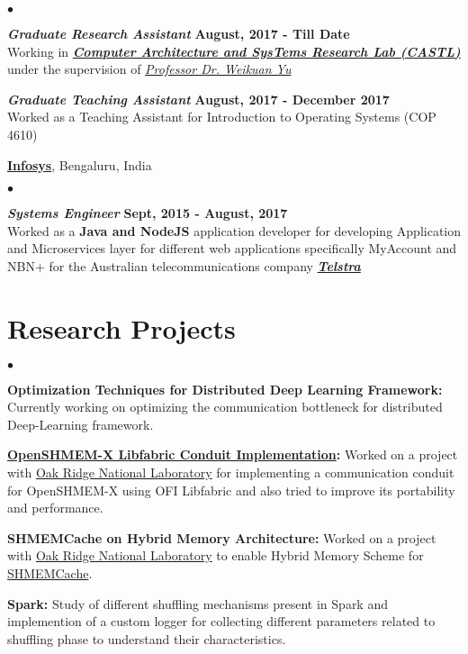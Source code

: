 \documentclass[margin,line]{res}
\newenvironment{list2}{
  \begin{list}{$\bullet$}{%
      \setlength{\itemsep}{0in}
      \setlength{\parsep}{0in} \setlength{\parskip}{0in}
      \setlength{\topsep}{0in} \setlength{\partopsep}{0in} 
      \setlength{\leftmargin}{0.2in}}}{\end{list}}
\begin{document}
\begin{resume}
\begin{list2}
\item \textbf{{\em Graduate Research Assistant}} \hfill {\bf August, 2017 - 
Till 
Date}\\
Working in \textbf{\textit{\href{http://castl.cs.fsu.edu/doku.php/}{Computer 
Architecture and SysTems Research Lab (CASTL)}}} under the supervision of 
\textit{\href{https://www.cs.fsu.edu/~yuw/}{Professor Dr. Weikuan Yu}}

\item \textbf{{\em Graduate Teaching Assistant}} \hfill {\bf August, 2017 - 
December 
2017}\\
Worked as a Teaching Assistant for Introduction to Operating Systems (COP 4610)
\end{list2}
\vspace{-.4cm}

{\bf \href{https://www.infosys.com/}{Infosys}}, Bengaluru, India
\begin{list2}
\item \textbf{{\em Systems Engineer}} \hfill {\bf Sept, 2015 - August, 2017}\\
Worked as a {\bf Java and NodeJS} application developer for developing 
Application and Microservices layer for different web applications specifically 
MyAccount and NBN+ for the Australian telecommunications company
\textbf{\textit{\href{https://www.telstra.com.au/Telstra/}{Telstra}}}
\end{list2}
\vspace*{-.18in}
\section{\sc Research Projects}
\begin{list2}
	\item {\bf 
		{Optimization Techniques for Distributed Deep Learning Framework}:} 
		Currently working on optimizing the communication bottleneck for 
		distributed Deep-Learning framework.
	\item {\bf 
		\href{https://github.com/ornl-languages/ornl-openshmem/}{OpenSHMEM-X 
			Libfabric 
			Conduit Implementation}:} Worked on a project with 
	\href{https://www.ornl.gov/}{Oak Ridge National Laboratory} for 
	implementing a 
	communication conduit for OpenSHMEM-X using OFI Libfabric and also tried to 
	improve 
	its portability and performance.
	\item {\bf SHMEMCache on Hybrid Memory Architecture:} Worked on a project 
	with 
	\href{https://www.ornl.gov/}{Oak Ridge National Laboratory} to enable 
	Hybrid 
	Memory Scheme for 
	\href{http://ww2.cs.fsu.edu/~fu/files/shmemcache-ccgrid17-paper.pdf}{SHMEMCache}.
	\item {\bf Spark:} Study of different shuffling mechanisms present in 
	Spark 
	and 
	implemention of a custom logger for collecting different parameters related 
	to 
	shuffling phase to understand their characteristics.
\end{list2}


\end{resume}
\end{document}
